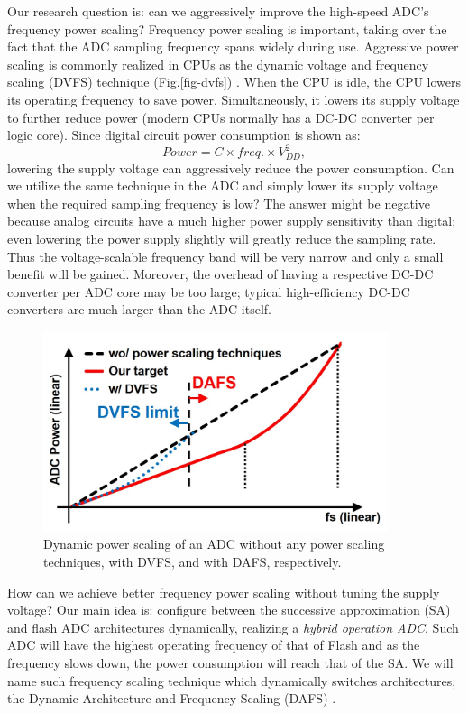 Our research question is: can we aggressively improve the high-speed ADC's frequency power scaling? Frequency power scaling is important, taking over the fact that the ADC sampling frequency spans widely during use.
Aggressive power scaling is commonly realized in CPUs as the dynamic voltage and frequency scaling (DVFS) technique (Fig.\ref{fig-dvfs}) \cite{DVFS}.
When the CPU is idle, the CPU lowers its operating frequency to save power. Simultaneously, it lowers its supply voltage to further reduce power (modern CPUs normally has a DC-DC converter per logic core). Since digital circuit power consumption is shown as:
\begin{equation}
    Power = C \times freq. \times V_{DD} ^2,
\end{equation}
lowering the supply voltage can aggressively reduce the power consumption.
Can we utilize the same technique in the ADC and simply lower its supply voltage when the required sampling frequency is low?
The answer might be negative because analog circuits have a much higher power supply sensitivity than digital; even lowering the power supply slightly will greatly reduce the sampling rate.
Thus the voltage-scalable frequency band will be very narrow and only a small benefit will be gained. 
Moreover, the overhead of having a respective DC-DC converter per ADC core may be too large; typical high-efficiency DC-DC converters are much larger than the ADC itself.

\begin{figure}[!]
\centering
  \includegraphics[width=0.9\textwidth]{figure/chap3/fig1.jpg}
  \caption{Dynamic power scaling of an ADC without any power scaling techniques, with DVFS, and with DAFS, respectively.}
  \label{fig-3-1}
\end{figure}

How can we achieve better frequency power scaling without tuning the supply voltage?
Our main idea is: configure between the successive approximation (SA) and flash ADC architectures dynamically, realizing a \textit{hybrid operation ADC}.
Such ADC will have the highest operating frequency of that of Flash and as the frequency slows down, the power consumption will reach that of the SA.
We will name such frequency scaling technique which dynamically switches architectures, the Dynamic Architecture and Frequency Scaling (DAFS) \cite{yoshioka2015dynamic}\cite{yoshiokaDAFS}. 

